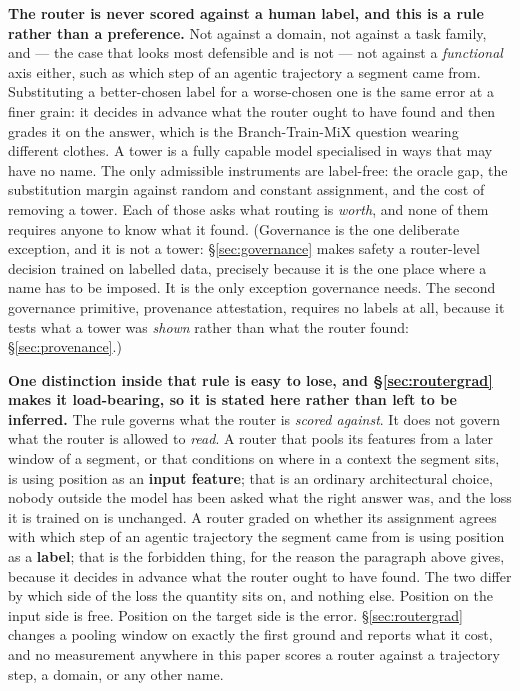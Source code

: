 \documentclass[11pt]{article}
\begin{document}
\textbf{The router is never scored against a human label, and this is a rule rather than a preference.} Not against a domain, not against a task family, and --- the case that looks most defensible and is not --- not against a \emph{functional} axis either, such as which step of an agentic trajectory a segment came from. Substituting a better-chosen label for a worse-chosen one is the same error at a finer grain: it decides in advance what the router ought to have found and then grades it on the answer, which is the Branch-Train-MiX question wearing different clothes. A tower is a fully capable model specialised in ways that may have no name. The only admissible instruments are label-free: the oracle gap, the substitution margin against random and constant assignment, and the cost of removing a tower. Each of those asks what routing is \emph{worth}, and none of them requires anyone to know what it found. (Governance is the one deliberate exception, and it is not a tower: \S\ref{sec:governance} makes safety a router-level decision trained on labelled data, precisely because it is the one place where a name has to be imposed. It is the only exception governance needs. The second governance primitive, provenance attestation, requires no labels at all, because it tests what a tower was \emph{shown} rather than what the router found: \S\ref{sec:provenance}.)

\textbf{One distinction inside that rule is easy to lose, and \S\ref{sec:routergrad} makes it load-bearing, so it is stated here rather than left to be inferred.} The rule governs what the router is \emph{scored against}. It does not govern what the router is allowed to \emph{read}. A router that pools its features from a later window of a segment, or that conditions on where in a context the segment sits, is using position as an \textbf{input feature}; that is an ordinary architectural choice, nobody outside the model has been asked what the right answer was, and the loss it is trained on is unchanged. A router graded on whether its assignment agrees with which step of an agentic trajectory the segment came from is using position as a \textbf{label}; that is the forbidden thing, for the reason the paragraph above gives, because it decides in advance what the router ought to have found. The two differ by which side of the loss the quantity sits on, and nothing else. Position on the input side is free. Position on the target side is the error. \S\ref{sec:routergrad} changes a pooling window on exactly the first ground and reports what it cost, and no measurement anywhere in this paper scores a router against a trajectory step, a domain, or any other name.
\end{document}
